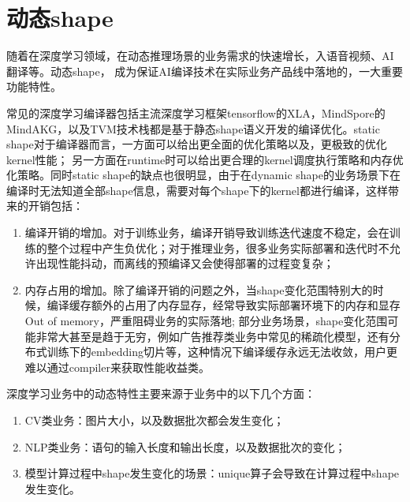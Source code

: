 \chapter{动态shape}

随着在深度学习领域，在动态推理场景的业务需求的快速增长，入语音视频、AI翻译等。动态shape，
成为保证AI编译技术在实际业务产品线中落地的，一大重要功能特性。

常见的深度学习编译器包括主流深度学习框架tensorflow的XLA，MindSpore的MindAKG，以及TVM技术栈都是基于静态shape语义开发的编译优化。static shape对于编译器而言，一方面可以给出更全面的优化策略以及，更极致的优化kernel性能；
另一方面在runtime时可以给出更合理的kernel调度执行策略和内存优化策略。同时static shape的缺点也很明显，由于在dynamic shape的业务场景下在编译时无法知道全部shape信息，需要对每个shape下的kernel都进行编译，这样带来的开销包括：

\begin{enumerate}
	\item 编译开销的增加。对于训练业务，编译开销导致训练迭代速度不稳定，会在训练的整个过程中产生负优化；对于推理业务，很多业务实际部署和迭代时不允许出现性能抖动，而离线的预编译又会使得部署的过程变复杂；
    \item 内存占用的增加。除了编译开销的问题之外，当shape变化范围特别大的时候，编译缓存额外的占用了内存显存，经常导致实际部署环境下的内存和显存Out of memory，严重阻碍业务的实际落地;
部分业务场景，shape变化范围可能非常大甚至是趋于无穷，例如广告推荐类业务中常见的稀疏化模型，还有分布式训练下的embedding切片等，这种情况下编译缓存永远无法收敛，用户更难以通过compiler来获取性能收益类。
\end{enumerate}

深度学习业务中的动态特性主要来源于业务中的以下几个方面：

\begin{enumerate}
	\item CV类业务：图片大小，以及数据批次都会发生变化；
    \item NLP类业务：语句的输入长度和输出长度，以及数据批次的变化；
    \item 模型计算过程中shape发生变化的场景：unique算子会导致在计算过程中shape发生变化。
\end{enumerate}